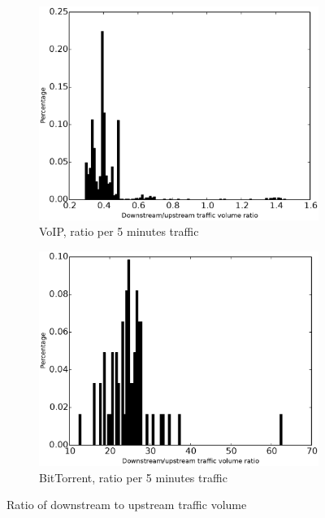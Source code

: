 \begin{figure}
\begin{subfigure}{0.32\linewidth}
\includegraphics[width=\linewidth]{image/ratio_downstream_upstream_traffic_volume_voip.eps}
\caption{VoIP, ratio per 5 minutes traffic}
\label{ratio_downstream_upstream_traffic_volume_voip}
\end{subfigure}
\begin{subfigure}{0.32\linewidth}
\includegraphics[width=\linewidth]{image/ratio_downstream_upstream_traffic_volume_bittorrent.eps}
\caption{BitTorrent, ratio per 5 minutes traffic}
\label{ratio_downstream_upstream_traffic_volume_bittorrent}
\end{subfigure}
\caption{Ratio of downstream to upstream traffic volume}
\end{figure}

